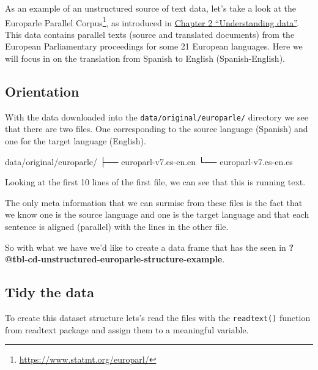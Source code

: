 \documentclass[
  letterpaper,
  DIV=11,
  numbers=noendperiod]{scrreport}
\newenvironment{Shaded}{\begin{snugshade}}{\end{snugshade}}
\newcommand{\ExtensionTok}[1]{\textcolor[rgb]{0.00,0.00,0.00}{#1}}
\newcommand{\NormalTok}[1]{\textcolor[rgb]{0.00,0.00,0.00}{#1}}
\theoremstyle{definition}
\theoremstyle{remark}
\DeclareRobustCommand{\href}[2]{#2\footnote{\url{#1}}}
\begin{document}
As an example of an unstructured source of text data, let's take a look
at the \href{https://www.statmt.org/europarl/}{Europarle Parallel
Corpus}, as introduced in
\protect\hyperlink{sec-understanding-data}{Chapter 2 ``Understanding
data''}. This data contains parallel texts (source and translated
documents) from the European Parliamentary proceedings for some 21
European languages. Here we will focus in on the translation from
Spanish to English (Spanish-English).

\hypertarget{orientation}{%
\subsection{Orientation}\label{orientation}}

With the data downloaded into the \texttt{data/original/europarle/}
directory we see that there are two files. One corresponding to the
source language (Spanish) and one for the target language (English).

\begin{Shaded}
\begin{Highlighting}[]
\ExtensionTok{data/original/europarle/}
\ExtensionTok{├──}\NormalTok{ europarl{-}v7.es{-}en.en}
\ExtensionTok{└──}\NormalTok{ europarl{-}v7.es{-}en.es}
\end{Highlighting}
\end{Shaded}

Looking at the first 10 lines of the first file, we can see that this is
running text.

The only meta information that we can surmise from these files is the
fact that we know one is the source language and one is the target
language and that each sentence is aligned (parallel) with the lines in
the other file.

So with what we have we'd like to create a data frame that has the seen
in \textbf{?@tbl-cd-unstructured-europarle-structure-example}.

\begin{table}

\end{table}

\hypertarget{tidy-the-data}{%
\subsection{Tidy the data}\label{tidy-the-data}}

To create this dataset structure lets's read the files with the
\texttt{readtext()} function from readtext package and assign them to a
meaningful variable.
\end{document}
